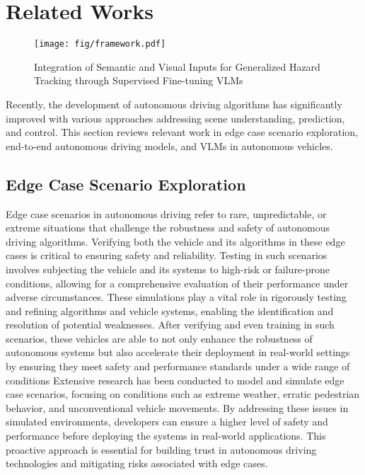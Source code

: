 \section{Related Works}
\begin{figure*}[!th]
    \centering
    \texttt{[image: fig/framework.pdf]}
    \caption{Integration of Semantic and Visual Inputs for Generalized Hazard Tracking through Supervised Fine-tuning VLMs}
    \label{fig:framework}
\end{figure*}
Recently, the development of autonomous driving algorithms has significantly improved with various approaches addressing scene understanding, prediction, and control\cite{min2024driveworld,zhao2024enhanced,huang2020multi}. This section reviews relevant work in edge case scenario exploration, end-to-end autonomous driving models, and VLMs in autonomous vehicles.
\subsection{Edge Case Scenario Exploration}
Edge case scenarios in autonomous driving refer to rare, unpredictable, or extreme situations that challenge the robustness and safety of autonomous driving algorithms\cite{Cai2024A, Karunakaran2023Generating}. Verifying both the vehicle and its algorithms in these edge cases is critical to ensuring safety and reliability\cite{feng2023dense}. 
Testing in such scenarios involves subjecting the vehicle and its systems to high-risk or failure-prone conditions, allowing for a comprehensive evaluation of their performance under adverse circumstances\cite{goss2021generation, Zhang2023Finding}.
These simulations play a vital role in rigorously testing and refining algorithms and vehicle systems, enabling the identification and resolution of potential weaknesses\cite{Saffary2024Developing}. After verifying and even training in such scenarios, these vehicles are able to not only enhance the robustness of autonomous systems but also accelerate their deployment in real-world settings by ensuring they meet safety and performance standards under a wide range of conditions 
% 
Extensive research has been conducted to model and simulate edge case scenarios, focusing on conditions such as extreme weather, erratic pedestrian behavior, and unconventional vehicle movements\cite{chen2023using, Luo2021Interactive, chen2024deep}. By addressing these issues in simulated environments, developers can ensure a higher level of safety and performance before deploying the systems in real-world applications\cite{Ghodsi2021Generating}. This proactive approach is essential for building trust in autonomous driving technologies and mitigating risks associated with edge cases.

